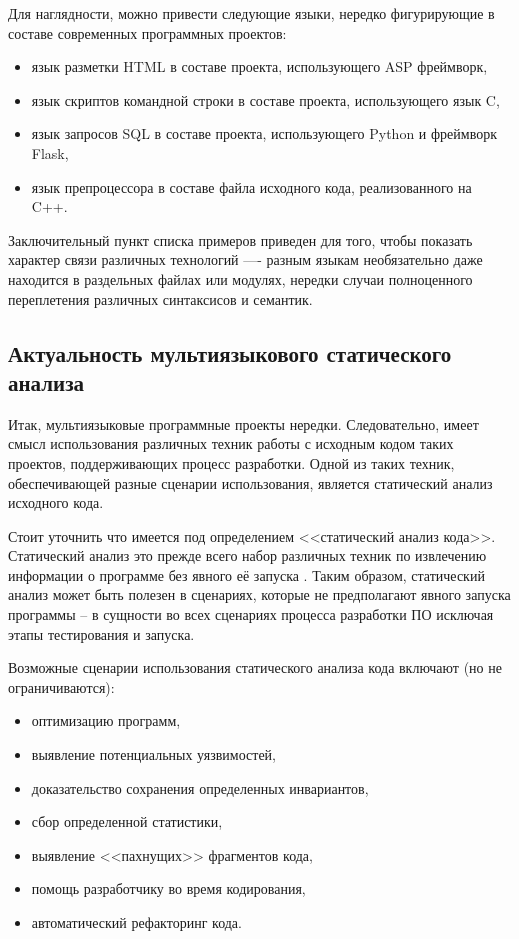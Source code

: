 Для наглядности, можно привести следующие языки, нередко фигурирующие в составе современных программных проектов:
\begin{itemize}    
    \item язык разметки HTML в составе проекта, использующего ASP фреймворк,
    \item язык скриптов командной строки в составе проекта, использующего язык C,
    \item язык запросов SQL в составе проекта, использующего Python и фреймворк Flask,
    \item язык препроцессора в составе файла исходного кода, реализованного на C++.
\end{itemize}
Заключительный пункт списка примеров приведен для того, чтобы показать характер
связи различных технологий —- разным языкам необязательно даже находится в раздельных
файлах или модулях, нередки случаи полноценного переплетения различных синтаксисов и
семантик.

\subsection{Актуальность мультиязыкового статического анализа}

Итак, мультиязыковые программные проекты нередки. Следовательно, имеет смысл использования
различных техник работы с исходным кодом таких проектов, поддерживающих процесс разработки.
Одной из таких техник, обеспечивающей разные сценарии использования, является статический анализ
исходного кода. 

Стоит уточнить что имеется под определением <<статический анализ кода>>. Статический
анализ это прежде всего набор различных техник по извлечению информации о программе без
явного её запуска \cite{static-program-analysis}. Таким образом, статический анализ может
быть полезен в сценариях, которые не предполагают явного запуска программы -- в сущности во
всех сценариях процесса разработки ПО исключая этапы тестирования и запуска.

Возможные сценарии использования статического анализа кода включают (но не ограничиваются):
\begin{itemize}
    \item оптимизацию программ,
    \item выявление потенциальных уязвимостей,
    \item доказательство сохранения определенных инвариантов,
    \item сбор определенной статистики,
    \item выявление <<пахнущих>> фрагментов кода,
    \item помощь разработчику во время кодирования,
    \item автоматический рефакторинг кода.
\end{itemize}

